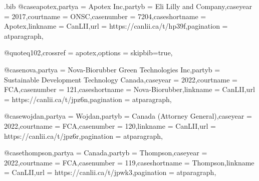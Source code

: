 \begin{filecontents*}[overwrite]{\jobname.bib}
@case{apotex,partya = {Apotex Inc},partyb = {Eli Lilly and Company},caseyear = {2017},courtname = {ONSC},casenumber = {7204},caseshortname = {Apotex},linkname = {CanLII},url = {https://canlii.ca/t/hp39f},pagination = {atparagraph},}

@quote{q102,crossref = {apotex},options = {skipbib=true},}

@case{nova,partya = {Nova-Biorubber Green Technologies Inc},partyb = {Sustainable Development Technology Canada},caseyear = {2022},courtname = {FCA},casenumber = {121},caseshortname = {Nova-Biorubber},linkname = {CanLII},url = {https://canlii.ca/t/jpz6n},pagination = {atparagraph},}

@case{wojdan,partya = {Wojdan},partyb = {Canada (Attorney General)},caseyear = {2022},courtname = {FCA},casenumber = {120},linkname = {CanLII},url = {https://canlii.ca/t/jpz6r},pagination = {atparagraph},}

@case{thompson,partya = {Canada},partyb = {Thompson},caseyear = {2022},courtname = {FCA},casenumber = {119},caseshortname = {Thompson},linkname = {CanLII},url = {https://canlii.ca/t/jpwk3},pagination = {atparagraph},}






\end{filecontents*}



\documentclass{article}
\newcommand\rulesep{\rule{0.4\textwidth}{.4pt}}

\usepackage[table,dvipsnames,svgnames]{xcolor}
\pagecolor{blue!3}
\usepackage{fontspec}
\setmainfont{Noto Serif}
\setsansfont{TeX Gyre Adventor}[Scale=1.2]%
\setmonofont{Noto Sans Mono}%
\newfontface{}[Colour=blue]
\newcommand\circnum[1]{{\fcircnum#1}}
\usepackage[french,british]{babel}
\usepackage{csquotes}
\usepackage{graphicx}

\usepackage{marginnote}
\usepackage{microtype}
\usepackage{parskip}
\newcommand\defaultparskip{\setlength\parskip{0pt}}
\newcommand\normalparskip{\parskip=.5\baselineskip plus 2pt\relax}

\usepackage{splitidx}



\newcommand\theadcolour{\rowcolor{blue!80!green!20!yellow}}

\newcommand\note[1]{(\texttt{#1})}



